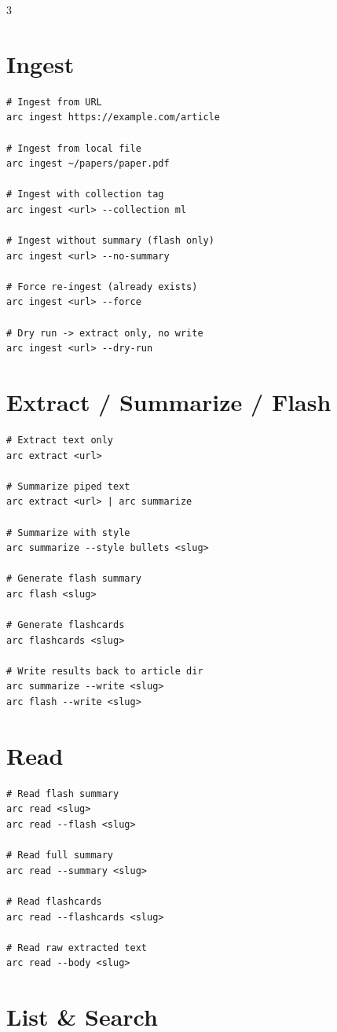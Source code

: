 \documentclass[10pt,a4paper,landscape]{article}
\begin{document}
\begin{multicols}{3}
\section{Ingest}

\begin{lstlisting}
# Ingest from URL
arc ingest https://example.com/article

# Ingest from local file
arc ingest ~/papers/paper.pdf

# Ingest with collection tag
arc ingest <url> --collection ml

# Ingest without summary (flash only)
arc ingest <url> --no-summary

# Force re-ingest (already exists)
arc ingest <url> --force

# Dry run -> extract only, no write
arc ingest <url> --dry-run
\end{lstlisting}

\section{Extract / Summarize / Flash}

\begin{lstlisting}
# Extract text only
arc extract <url>

# Summarize piped text
arc extract <url> | arc summarize

# Summarize with style
arc summarize --style bullets <slug>

# Generate flash summary
arc flash <slug>

# Generate flashcards
arc flashcards <slug>

# Write results back to article dir
arc summarize --write <slug>
arc flash --write <slug>
\end{lstlisting}

\section{Read}

\begin{lstlisting}
# Read flash summary
arc read <slug>
arc read --flash <slug>

# Read full summary
arc read --summary <slug>

# Read flashcards
arc read --flashcards <slug>

# Read raw extracted text
arc read --body <slug>
\end{lstlisting}

\section{List \& Search}


\end{multicols}
\end{document}

